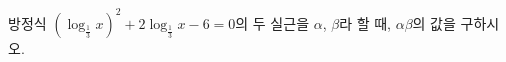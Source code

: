 방정식 $(\log_{\frac{1}{3}} x)^2+2\log_{\frac{1}{3}} x-6=0$의 두 실근을 $\alpha$, $\beta$라 할 때, $\alpha\beta$의 값을 구하시오.

